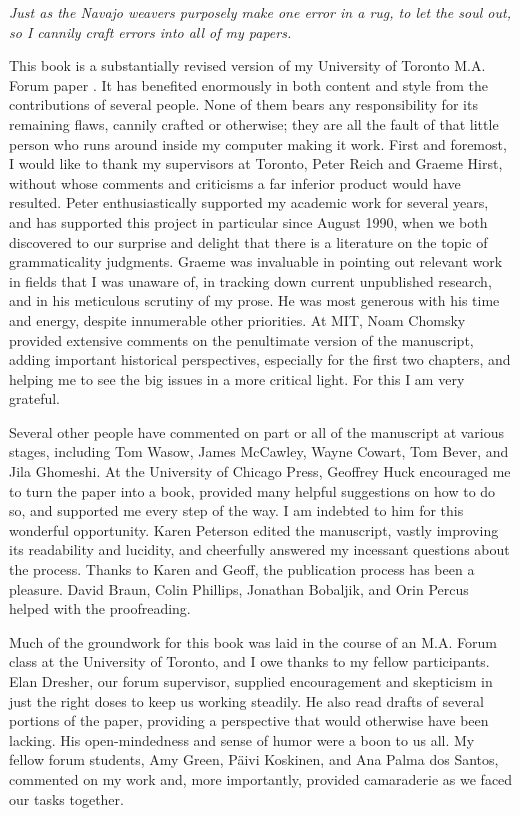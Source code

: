 \epigraph{\itshape Just as the Navajo weavers purposely make one error in a rug, to let the soul out, so I cannily craft errors into all of my papers.\\[-2\baselineskip]}{\citep{Ross1979}}

\noindent This book is a substantially revised version of my University of Toronto M.A. Forum paper \citep{Schutze1991}. It has benefited enormously in both content and style from the contributions of several people. None of them bears any responsibility for its remaining flaws, cannily crafted or otherwise; they are all the fault of that little person who runs around inside my computer making it work. First and foremost, I would like to thank my supervisors at Toronto, Peter Reich and Graeme Hirst, without whose comments and criticisms a far inferior product would have resulted. Peter enthusiastically supported my academic work for several years, and has supported this project in particular since August 1990, when we both discovered to our surprise and delight that there is a literature on the topic of grammaticality judgments. Graeme was invaluable in pointing out relevant work in fields that I was unaware of, in tracking down current unpublished research, and in his meticulous scrutiny of my prose. He was most generous with his time and energy, despite innumerable other priorities. At MIT, Noam Chomsky provided extensive comments on the penultimate version of the manuscript, adding important historical perspectives, especially for the first two chapters, and helping me to see the big issues in a more critical light. For this I am very grateful. 

\enlargethispage{\baselineskip}
Several other people have commented on part or all of the manuscript at various stages, including Tom Wasow, James McCawley, Wayne Cowart, Tom Bever, and Jila Ghomeshi. At the University of Chicago Press, Geoffrey Huck encouraged me to turn the paper into a book, provided many helpful suggestions on how to do so, and supported me every step of the way. I am indebted to him for this wonderful opportunity. Karen Peterson edited the manuscript, vastly improving its readability and lucidity, and cheerfully answered my incessant questions about the process. Thanks to Karen and Geoff, the publication process has been a pleasure. David Braun, Colin Phillips, Jonathan Bobaljik, and Orin Percus helped with the proofreading. 

Much of the groundwork for this book was laid in the course of an M.A. Forum class at the University of Toronto, and I owe thanks to my fellow participants. Elan Dresher, our forum supervisor, supplied encouragement and skepticism in just the right doses to keep us working steadily. He also read drafts of several portions of the paper, providing a perspective that would otherwise have been lacking. His open-mindedness and sense of humor were a boon to us all. My fellow forum students, Amy Green, Päivi Koskinen, and Ana Palma dos Santos, commented on my work and, more importantly, provided camaraderie as we faced our tasks together.

